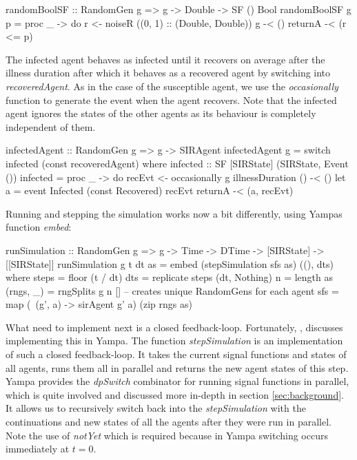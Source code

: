 \begin{HaskellCode}
randomBoolSF :: RandomGen g => g -> Double -> SF () Bool
randomBoolSF g p = proc _ -> do
  r <- noiseR ((0, 1) :: (Double, Double)) g -< ()
  returnA -< (r <= p)
\end{HaskellCode}

The infected agent behaves as infected until it recovers on average after the illness duration after which it behaves as a recovered agent by switching into \textit{recoveredAgent}. As in the case of the susceptible agent, we use the \textit{occasionally} function to generate the event when the agent recovers. Note that the infected agent ignores the states of the other agents as its behaviour is completely independent of them.

\begin{HaskellCode}
infectedAgent :: RandomGen g => g -> SIRAgent
infectedAgent g = switch infected (const recoveredAgent)
  where
    infected :: SF [SIRState] (SIRState, Event ())
    infected = proc _ -> do
      recEvt <- occasionally g illnessDuration () -< ()
      let a = event Infected (const Recovered) recEvt
      returnA -< (a, recEvt)
\end{HaskellCode}

Running and stepping the simulation works now a bit differently, using Yampas function \textit{embed}:

\begin{HaskellCode}
runSimulation :: RandomGen g => g -> Time -> DTime -> [SIRState] -> [[SIRState]]
runSimulation g t dt as = embed (stepSimulation sfs as) ((), dts)
  where
    steps     = floor (t / dt)
    dts       = replicate steps (dt, Nothing)
    n         = length as
    (rngs, _) = rngSplits g n [] -- creates unique RandomGens for each agent
    sfs       = map (\ (g', a) -> sirAgent g' a) (zip rngs as)
\end{HaskellCode}

What need to implement next is a closed feedback-loop. Fortunately, \cite{nilsson_functional_2002}, \cite{courtney_yampa_2003} discusses implementing this in Yampa. The function \textit{stepSimulation} is an implementation of such a closed feedback-loop. It takes the current signal functions and states of all agents, runs them all in parallel and returns the new agent states of this step. Yampa provides the \textit{dpSwitch} combinator for running signal functions in parallel, which is quite involved and discussed more in-depth in section \ref{sec:background}. It allows us to recursively switch back into the \textit{stepSimulation} with the continuations and new states of all the agents after they were run in parallel. Note the use of \textit{notYet} which is required because in Yampa switching occurs immediately at $t = 0$.

